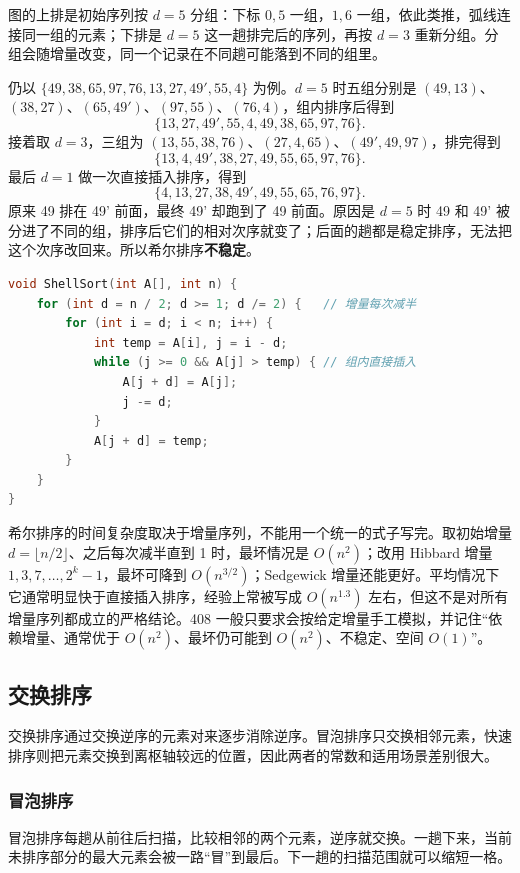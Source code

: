 图的上排是初始序列按 $d=5$ 分组：下标 $0,5$ 一组，$1,6$ 一组，依此类推，弧线连接同一组的元素；下排是 $d=5$ 这一趟排完后的序列，再按 $d=3$ 重新分组。分组会随增量改变，同一个记录在不同趟可能落到不同的组里。

仍以 $\{49,38,65,97,76,13,27,49',55,4\}$ 为例。$d=5$ 时五组分别是 $(49,13)$、$(38,27)$、$(65,49')$、$(97,55)$、$(76,4)$，组内排序后得到
\[
\{13,27,49',55,4,49,38,65,97,76\}.
\]
接着取 $d=3$，三组为 $(13,55,38,76)$、$(27,4,65)$、$(49',49,97)$，排完得到
\[
\{13,4,49',38,27,49,55,65,97,76\}.
\]
最后 $d=1$ 做一次直接插入排序，得到
\[
\{4,13,27,38,49',49,55,65,76,97\}.
\]
原来 49 排在 49' 前面，最终 49' 却跑到了 49 前面。原因是 $d=5$ 时 49 和 49' 被分进了不同的组，排序后它们的相对次序就变了；后面的趟都是稳定排序，无法把这个次序改回来。所以希尔排序\textbf{不稳定}。

\begin{lstlisting}[language=C]
void ShellSort(int A[], int n) {
    for (int d = n / 2; d >= 1; d /= 2) {   // 增量每次减半
        for (int i = d; i < n; i++) {
            int temp = A[i], j = i - d;
            while (j >= 0 && A[j] > temp) { // 组内直接插入
                A[j + d] = A[j];
                j -= d;
            }
            A[j + d] = temp;
        }
    }
}
\end{lstlisting}

希尔排序的时间复杂度取决于增量序列，不能用一个统一的式子写完。取初始增量 $d=\lfloor n/2\rfloor$、之后每次减半直到 1 时，最坏情况是 $O(n^2)$；改用 Hibbard 增量 $1,3,7,\dots,2^k-1$，最坏可降到 $O(n^{3/2})$；Sedgewick 增量还能更好。平均情况下它通常明显快于直接插入排序，经验上常被写成 $O(n^{1.3})$ 左右，但这不是对所有增量序列都成立的严格结论。408 一般只要求会按给定增量手工模拟，并记住“依赖增量、通常优于 $O(n^2)$、最坏仍可能到 $O(n^2)$、不稳定、空间 $O(1)$”。

\subsection{交换排序}

交换排序通过交换逆序的元素对来逐步消除逆序。冒泡排序只交换相邻元素，快速排序则把元素交换到离枢轴较远的位置，因此两者的常数和适用场景差别很大。

\subsubsection{冒泡排序}

冒泡排序每趟从前往后扫描，比较相邻的两个元素，逆序就交换。一趟下来，当前未排序部分的最大元素会被一路“冒”到最后。下一趟的扫描范围就可以缩短一格。

